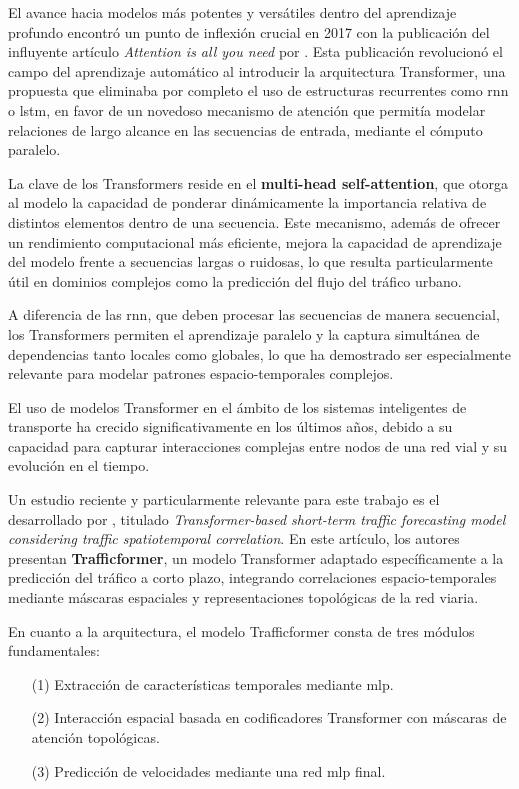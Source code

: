 El avance hacia modelos más potentes y versátiles dentro del aprendizaje profundo encontró un punto de inflexión crucial en 2017 con la publicación del influyente artículo \textit{Attention is all you need} por \cite{attentionIsAllYouNeed}. Esta publicación revolucionó el campo del aprendizaje automático al introducir la arquitectura Transformer, una propuesta que eliminaba por completo el uso de estructuras recurrentes como \acrshort{rnn} o \acrshort{lstm}, en favor de un novedoso mecanismo de atención que permitía modelar relaciones de largo alcance en las secuencias de entrada, mediante el cómputo paralelo.

La clave de los Transformers reside en el \textbf{multi-head self-attention}, que otorga al modelo la capacidad de ponderar dinámicamente la importancia relativa de distintos elementos dentro de una secuencia. Este mecanismo, además de ofrecer un rendimiento computacional más eficiente, mejora la capacidad de aprendizaje del modelo frente a secuencias largas o ruidosas, lo que resulta particularmente útil en dominios complejos como la predicción del flujo del tráfico urbano.

A diferencia de las \acrshort{rnn}, que deben procesar las secuencias de manera secuencial, los Transformers permiten el aprendizaje paralelo y la captura simultánea de dependencias tanto locales como globales, lo que ha demostrado ser especialmente relevante para modelar patrones espacio-temporales complejos.

\vspace{0.5cm}

El uso de modelos Transformer en el ámbito de los sistemas inteligentes de transporte ha crecido significativamente en los últimos años, debido a su capacidad para capturar interacciones complejas entre nodos de una red vial y su evolución en el tiempo.

Un estudio reciente y particularmente relevante para este trabajo es el desarrollado por \cite{trafficformer}, titulado \textit{Transformer-based short-term traffic forecasting model considering traffic spatiotemporal correlation}. En este artículo, los autores presentan \textbf{Trafficformer}, un modelo Transformer adaptado específicamente a la predicción del tráfico a corto plazo, integrando correlaciones espacio-temporales mediante máscaras espaciales y representaciones topológicas de la red viaria.

En cuanto a la arquitectura, el modelo Trafficformer consta de tres módulos fundamentales: 
\begin{itemize}
	\item[(1)] Extracción de características temporales mediante \acrlong{mlp}. 
	\item[(2)] Interacción espacial basada en codificadores Transformer con máscaras de atención topológicas. 
	\item[(3)] Predicción de velocidades mediante una red \acrshort{mlp} final. 
\end{itemize}

